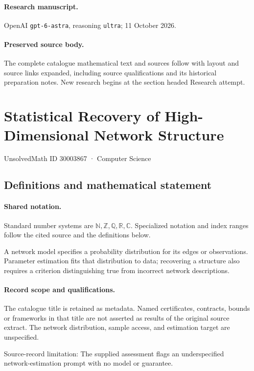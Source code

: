 \documentclass[11pt]{article}
\begin{document}
\paragraph{Research manuscript.} OpenAI \texttt{gpt-6-astra}, reasoning \texttt{ultra}; 11 October 2026.
\paragraph{Preserved source body.} The complete catalogue mathematical text and sources follow with layout and source links expanded, including source qualifications and its historical preparation notes. New research begins at the section headed Research attempt.

\section{Statistical Recovery of High-Dimensional Network Structure}\label{30003867}
{\small UnsolvedMath ID 30003867 · Computer Science}
\subsection{Definitions and mathematical statement}

\paragraph{Shared notation.}Standard number systems are $\mathbb N,\mathbb Z,\mathbb Q,\mathbb R,\mathbb C$. Specialized notation and index ranges follow the cited source and the definitions below.


A network model specifies a probability distribution for its edges or observations. Parameter estimation fits that distribution to data; recovering a structure also requires a criterion distinguishing true from incorrect network descriptions.
\paragraph{Record scope and qualifications.}
The catalogue title is retained as metadata. Named certificates, contracts, bounds or frameworks in that title are not asserted as results of the original source extract.
The network distribution, sample access, and estimation target are unspecified.

Source-record limitation: The supplied assessment flags an underspecified network-estimation prompt with no model or guarantee.
\end{document}
